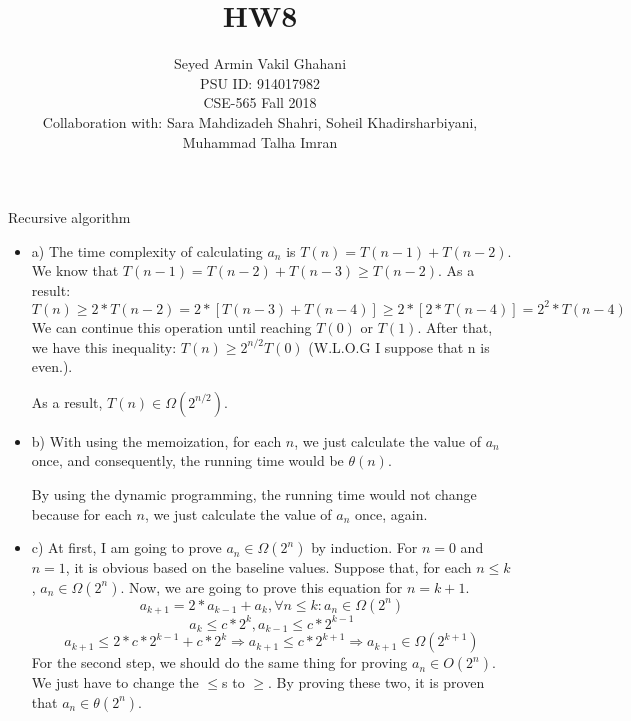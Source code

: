 \documentclass[12pt]{article}
\newenvironment{solution}[2][Solution]{\begin{trivlist}
\item[\hskip \labelsep {\bfseries #1}]}{\end{trivlist}}
\newenvironment{problem}[2][Problem]{\begin{trivlist}
\item[\hskip \labelsep {\bfseries #1}\hskip \labelsep {\bfseries #2.}]}{\end{trivlist}}
\begin{document}
 
\title{\textbf{HW8}}%
\author{Seyed Armin Vakil Ghahani\\ %
PSU ID: 914017982\\
CSE-565 Fall 2018\\
Collaboration with:
Sara Mahdizadeh Shahri, Soheil Khadirsharbiyani,\\
Muhammad Talha Imran} %
 
\maketitle
\begin{problem}{1}
Recursive algorithm
\end{problem}

\begin{solution}{}
\begin{itemize}
\item a) The time complexity of calculating $a_n$ is $T(n) = T(n-1) + T(n-2)$.
We know that $T(n-1) = T(n-2) + T(n-3) \geq T(n-2)$. As a result:
$$T(n) \geq 2 * T(n-2) = 2 * [T(n-3) + T(n-4)] \geq 2 * [ 2 * T(n-4) ] = 2^2 * T(n-4)$$
We can continue this operation until reaching $T(0)$ or $T(1)$. After that, we have
this inequality: $T(n) \geq 2^{n/2}T(0)$ (W.L.O.G I suppose that n is even.).

As a result, $T(n) \in \Omega(2^{n/2})$.
\item b) With using the memoization, for each $n$, we just calculate the value of
$a_n$ once, and consequently, the running time would be $\theta(n)$.

By using the dynamic programming, the running time would not change because for each $n$,
we just calculate the value of $a_n$ once, again.

\item c) At first, I am going to prove $a_n \in \Omega(2^n)$ by induction.
For $n=0$ and $n=1$, it is obvious based on the baseline values. Suppose that, for each
$n \leq k$, $a_n \in \Omega(2^n)$. Now, we are going to prove this equation for $n=k+1$.
$$a_{k+1} = 2*a_{k-1}+a_k , \forall n\leq k : a_n \in \Omega(2^n)$$
$$a_k \leq c*2^k , a_{k-1} \leq c*2^{k-1} $$
$$a_{k+1} \leq 2*c*2^{k-1} + c*2^k \Rightarrow a_{k+1} \leq c*2^{k+1} \Rightarrow 
a_{k+1} \in \Omega(2^{k+1})$$
For the second step, we should do the same thing for proving $a_n \in O(2^n)$. We just 
have to change the $\leq$s to $\geq$. By proving these two, it is proven that
$a_n \in \theta(2^n)$.
\end{itemize}
\end{solution}
\end{document}
